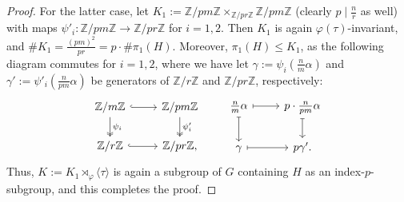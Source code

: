 \documentclass[table,dvipsnames]{amsart}
\newcommand{\Z}{\mathbb{Z}}
\newcommand{\angles}[1]{\langle #1\rangle}
\numberwithin{equation}{section}
\begin{document}
\begin{proof}
For the latter case, let $K_1:=\Z/pm\Z\times_{\Z/pr\Z}\Z/pm\Z$ (clearly $p\mid \frac{n}{r}$ as well) with maps $\psi'_i\colon\Z/pm\Z\to\Z/pr\Z$ for $i=1,2$. Then $K_1$ is again $\varphi(\tau)$-invariant, and $\#K_1=\frac{(pm)^2}{pr}=p\cdot\#\pi_1(H)$. Moreover, $\pi_1(H)\le K_1$, as the following diagram commutes for $i=1,2$, where we have let $\gamma:=\psi_i(\frac{n}{m}\alpha)$ and $\gamma':=\psi'_i(\frac{n}{pm}\alpha)$ be generators of $\Z/r\Z$ and $\Z/pr\Z$, respectively:
\begin{equation*}
\begin{tikzcd}
\Z/m\Z\arrow[hookrightarrow]{r}\arrow[twoheadrightarrow]{d}{\psi_i}&\Z/pm\Z\arrow[twoheadrightarrow]{d}{\psi'_i}\\
\Z/r\Z\arrow[hookrightarrow]{r}&\Z/pr\Z,
\end{tikzcd}
\qquad
\begin{tikzcd}
\frac{n}{m}\alpha\arrow[mapsto]{r}\arrow[mapsto]{d}&p\cdot\frac{n}{pm}\alpha\arrow[mapsto]{d}\\
\gamma\arrow[mapsto]{r}&p\gamma'.
\end{tikzcd}
\end{equation*}
Thus, $K:=K_1\rtimes_\varphi\angles{\tau}$ is again a subgroup of $G$ containing $H$ as an index-$p$-subgroup, and this completes the proof.
\end{proof}
\end{document}
